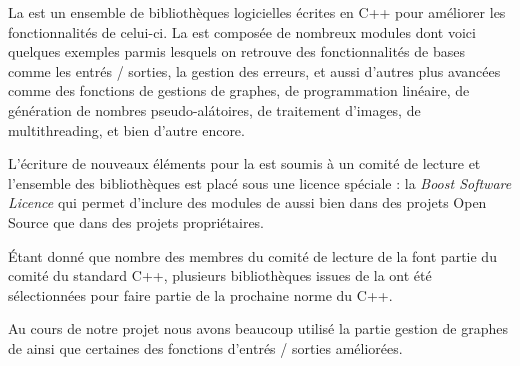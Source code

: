 
%


\par
La \boost est un ensemble de biblioth\`eques logicielles \'ecrites en C++ pour am\'eliorer les fonctionnalit\'es de celui-ci. La \boost est compos\'ee de nombreux modules dont voici quelques exemples parmis lesquels on retrouve des fonctionnalit\'es de bases comme les entr\'es / sorties, la gestion des erreurs, et aussi d'autres plus avanc\'ees comme des fonctions de gestions de graphes, de programmation lin\'eaire, de g\'en\'eration de nombres pseudo-al\'atoires, de traitement d'images, de multithreading, et bien d'autre encore.
\par
L'\'ecriture de nouveaux \'el\'ements pour la \boost est soumis \`a un  comit\'e de lecture et l'ensemble des biblioth\`eques est plac\'e sous une licence sp\'eciale : la \textit{Boost Software Licence} qui permet d'inclure des modules de \boost aussi bien dans des projets Open Source que dans des projets propri\'etaires.
\par
\'Etant donn\'e que nombre des membres du comit\'e de lecture de la \boost font partie du comit\'e du standard C++, plusieurs biblioth\`eques issues de la \boost ont \'et\'e s\'electionn\'ees pour faire partie de la prochaine norme du C++.
\par
Au cours de notre projet nous avons beaucoup utilis\'e la partie gestion de graphes de \boost ainsi que certaines des fonctions d'entr\'es / sorties am\'elior\'ees.

%
